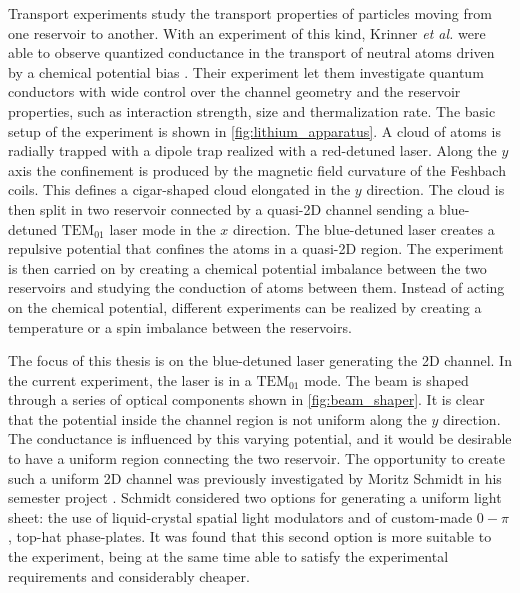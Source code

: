 Transport experiments study the transport properties of particles moving from one reservoir to another. With an experiment of this kind, Krinner \emph{et al.} were able to observe  quantized conductance in the transport of neutral atoms driven by a chemical potential bias \cite{krinner2015}. Their experiment let them investigate
quantum conductors with wide control over the channel
geometry and the reservoir properties, such as interaction strength, size and thermalization rate. The basic setup of the experiment is shown in \cref{fig:lithium_apparatus}. A cloud of atoms is radially trapped with a dipole trap realized with a red-detuned laser. Along the $y$ axis the confinement is produced by the magnetic field curvature of the Feshbach coils. This defines a cigar-shaped cloud elongated in the $y$ direction. The cloud is then split in two reservoir connected by a quasi-2D channel sending a blue-detuned $\text{TEM}_{01}$ laser mode in the $x$ direction. The blue-detuned laser creates a repulsive potential that confines the atoms in a quasi-2D region. The experiment is then carried on by creating a chemical potential imbalance between the two reservoirs and studying the conduction of atoms between them. Instead of acting on the chemical potential, different experiments can be realized by creating a temperature or a spin imbalance between the reservoirs.

The focus of this thesis is on the blue-detuned laser generating the 2D channel. In the current experiment, the laser is in a $\text{TEM}_{01}$ mode. The beam is shaped through a series of optical components shown in \cref{fig:beam_shaper}. It is clear that the potential inside the channel region is not uniform along the $y$ direction. The conductance is influenced by this varying potential, and it would be desirable to have a uniform region connecting the two reservoir. The opportunity to create such a uniform 2D channel was previously investigated by Moritz Schmidt in his semester project \cite{schmidt2021}. Schmidt considered two options for generating a uniform light sheet: the use of liquid-crystal spatial light modulators and of custom-made $0-\pi$, top-hat phase-plates. It was found that this second option is more suitable to the experiment, being at the same time  able to satisfy the experimental requirements and considerably cheaper.

